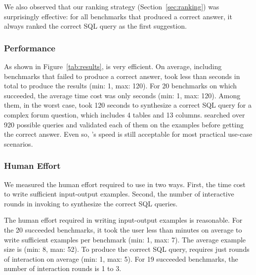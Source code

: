 We also observed that our ranking strategy (Section~\ref{sec:ranking})
was surprisingly effective: for all benchmarks that
\ourtool produced a correct answer, it always ranked the correct
SQL query as the first suggestion.

%

\subsubsection{Performance}
\label{sec:performance}

As shown in Figure~\ref{tab:results}, \ourtool
is very efficient.
On average,
including benchmarks that \ourtool failed to produce
a correct answer,
\ourtool took less than \avgtime seconds in total to
produce the results (min: 1, max: 120).
For 20 benchmarks on which \ourtool succeeded, the average
time cost was only \avgsucctime seconds (min: 1, max: 120). 
Among them, in the worst case, \ourtool took 120 seconds to synthesize a
correct SQL query for a complex forum question, which includes 4 tables
and 13 columns. \ourtool searched over 920 possible
queries and validated each of them on the examples before getting
the correct answer. Even so, \ourtool's speed is still acceptable
for most practical use-case scenarios.






\subsubsection{Human Effort}
\label{sec:human}

We measured the human effort required to use \ourtool in two ways.
First, the time cost to write sufficient input-output examples. Second,
the number of interactive rounds in invoking \ourtool
to synthesize the correct SQL queries.

The human effort required in writing
input-output examples is reasonable. For
the 20 succeeded benchmarks, it took the user less than
\avgsucchum minutes on average to write sufficient examples
per benchmark (min: 1, max: 7). The
average example size is \avgsucctuple
(min: 8, man: 52).
To produce the correct SQL query,
\ourtool requires just \avgsuccround rounds of
interaction on average (min: 1, max: 5).
For 19 succeeded benchmarks, the number of interaction
rounds is 1 to 3.


